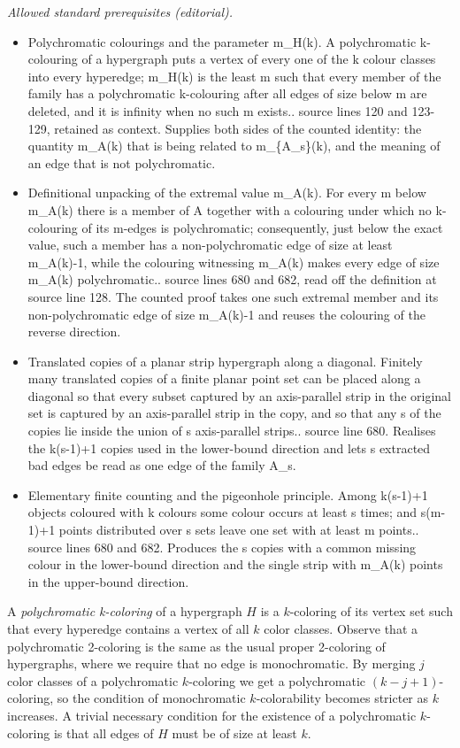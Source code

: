 \documentclass[10pt,a4paper]{amsart}
\begin{document}
\noindent\textit{Allowed standard prerequisites (editorial).}\begin{itemize}
\item Polychromatic colourings and the parameter m\_H(k). A polychromatic k-colouring of a hypergraph puts a vertex of every one of the k colour classes into every hyperedge; m\_H(k) is the least m such that every member of the family has a polychromatic k-colouring after all edges of size below m are deleted, and it is infinity when no such m exists.. source lines 120 and 123-129, retained as context. Supplies both sides of the counted identity: the quantity m\_A(k) that is being related to m\_\{A\_s\}(k), and the meaning of an edge that is not polychromatic.
\item Definitional unpacking of the extremal value m\_A(k). For every m below m\_A(k) there is a member of A together with a colouring under which no k-colouring of its m-edges is polychromatic; consequently, just below the exact value, such a member has a non-polychromatic edge of size at least m\_A(k)-1, while the colouring witnessing m\_A(k) makes every edge of size m\_A(k) polychromatic.. source lines 680 and 682, read off the definition at source line 128. The counted proof takes one such extremal member and its non-polychromatic edge of size m\_A(k)-1 and reuses the colouring of the reverse direction.
\item Translated copies of a planar strip hypergraph along a diagonal. Finitely many translated copies of a finite planar point set can be placed along a diagonal so that every subset captured by an axis-parallel strip in the original set is captured by an axis-parallel strip in the copy, and so that any s of the copies lie inside the union of s axis-parallel strips.. source line 680. Realises the k(s-1)+1 copies used in the lower-bound direction and lets s extracted bad edges be read as one edge of the family A\_s.
\item Elementary finite counting and the pigeonhole principle. Among k(s-1)+1 objects coloured with k colours some colour occurs at least s times; and s(m-1)+1 points distributed over s sets leave one set with at least m points.. source lines 680 and 682. Produces the s copies with a common missing colour in the lower-bound direction and the single strip with m\_A(k) points in the upper-bound direction.
\end{itemize}\medskip
A {\it polychromatic k-coloring} of a hypergraph $H$ is a $k$-coloring of its vertex set such that every hyperedge contains a vertex of all $k$ color classes. Observe that a polychromatic 2-coloring is the same as the usual proper 2-coloring of hypergraphs, where we require that no edge is monochromatic. By merging $j$ color classes of a polychromatic $k$-coloring we get a polychromatic $(k-j+1)$-coloring, so the condition of monochromatic $k$-colorability becomes stricter as $k$ increases. A trivial necessary condition for the existence of a polychromatic $k$-coloring is that all edges of $H$ must be of size at least $k$.
\end{document}
